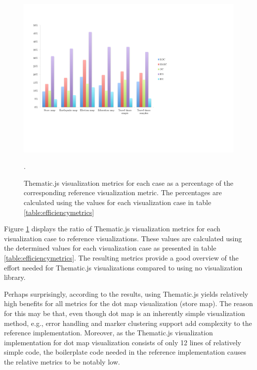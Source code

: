 \begin{figure}[htbp]
  \begin{center}
    \includegraphics[width=\textwidth]{images/evaluation-results.pdf}
    \caption{Thematic.js visualization metrics for each case as a percentage of the corresponding reference visualization metric. The percentages are calculated using the values for each visualization case in table \ref{table:efficiencymetrics}}.
    \label{fig:evaluationchart}
  \end{center}
\end{figure}

Figure \ref{fig:evaluationchart} displays the ratio of Thematic.js visualization metrics for each visualization case to reference visualizations. These values are calculated using the determined values for each visualization case as presented in table \ref{table:efficiencymetrics}. The resulting metrics provide a good overview of the effort needed for Thematic.js visualizations compared to using no visualization library.

Perhaps surprisingly, according to the results, using Thematic.js yields relatively high benefits for all metrics for the dot map visualization (store map). The reason for this may be that, even though dot map is an inherently simple visualization method, e.g., error handling and marker clustering support add complexity to the reference implementation. Moreover, as the Thematic.js visualization implementation for dot map visualization consists of only 12 lines of relatively simple code, the boilerplate code needed in the reference implementation causes the relative metrics to be notably low.

